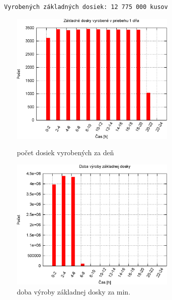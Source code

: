 \documentclass[12pt,a4paper,titlepage,final]{article}
\begin{document}
\begin{verbatim}
  Vyrobených základných dosiek: 12 775 000 kusov
\end{verbatim}

\begin{figure}[!ht]
  \centering
  \begin{minipage}{0.45\linewidth}
  \centering
  \includegraphics[width=8cm]{doc/3_hist1.eps}
  \caption{počet dosiek vyrobených za deň}
  \end{minipage}
  \quad
  \begin{minipage}{0.45\linewidth}
    \centering
    \includegraphics[width=8cm]{doc/3_hist2.eps}
    \caption{doba výroby základnej dosky za min.}
  \end{minipage}
\end{figure}
\end{document}
